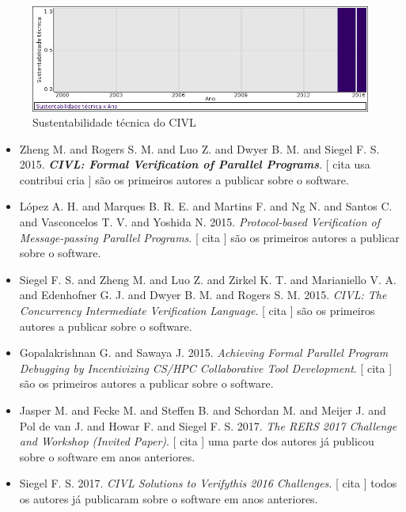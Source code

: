 \begin{figure}[h]
  \center
  \includegraphics[scale=0.50]{imagens/softwares-charts/civl.png}
  \caption{Sustentabilidade técnica do CIVL}
\end{figure}


\begin{itemize}
\item Zheng M. and Rogers S. M. and Luo Z. and Dwyer B. M. and Siegel F. S.
      2015.
        \textbf{\textit{ CIVL: Formal Verification of Parallel Programs}}.
      [
          cita
          usa
          contribui
          cria
      ]
são os primeiros autores a publicar sobre o software.
\item L\'{o}pez A. H. and Marques B. R. E. and Martins F. and Ng N. and Santos C. and Vasconcelos T. V. and Yoshida N.
      2015.
        \textit{ Protocol-based Verification of Message-passing Parallel Programs}.
      [
          cita
      ]
são os primeiros autores a publicar sobre o software.
\item Siegel F. S. and Zheng M. and Luo Z. and Zirkel K. T. and Marianiello V. A. and Edenhofner G. J. and Dwyer B. M. and Rogers S. M.
      2015.
        \textit{ CIVL: The Concurrency Intermediate Verification Language}.
      [
          cita
      ]
são os primeiros autores a publicar sobre o software.
\item Gopalakrishnan G. and Sawaya J.
      2015.
        \textit{ Achieving Formal Parallel Program Debugging by Incentivizing CS/HPC Collaborative Tool Development}.
      [
          cita
      ]
são os primeiros autores a publicar sobre o software.
\item Jasper M. and Fecke M. and Steffen B. and Schordan M. and Meijer J. and Pol de van J. and Howar F. and Siegel F. S.
      2017.
        \textit{ The RERS 2017 Challenge and Workshop (Invited Paper)}.
      [
          cita
      ]
uma parte dos autores já publicou sobre o software em anos anteriores.
\item Siegel F. S.
      2017.
        \textit{ CIVL Solutions to Verifythis 2016 Challenges}.
      [
          cita
      ]
todos os autores já publicaram sobre o software em anos anteriores.
\end{itemize}
